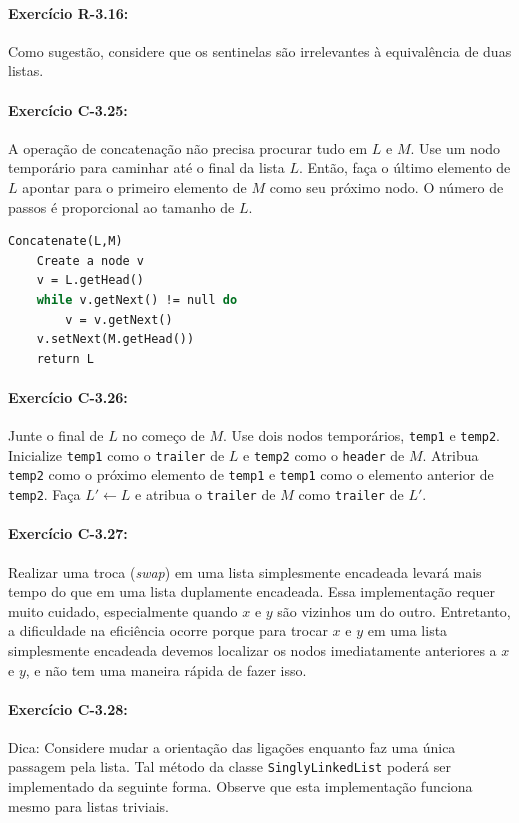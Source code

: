 \paragraph{Exercício R-3.16:}
Como sugestão, considere que os sentinelas são irrelevantes à equivalência de duas listas.

\paragraph{Exercício C-3.25:}
A operação de concatenação não precisa procurar tudo em $L$ e $M$. Use um nodo temporário para caminhar até o final da lista $L$. Então, faça o último elemento de $L$ apontar para o primeiro elemento de $M$ como seu próximo nodo. O número de passos é proporcional ao tamanho de $L$.

\begin{lstlisting}[frame=single,language=Pascal]
Concatenate(L,M)
	Create a node v
	v = L.getHead()
	while v.getNext() != null do
		v = v.getNext()
	v.setNext(M.getHead())
	return L
\end{lstlisting}

\paragraph{Exercício C-3.26:}
Junte o final de $L$ no começo de $M$. Use dois nodos temporários, \texttt{temp1} e \texttt{temp2}. Inicialize \texttt{temp1} como o \texttt{trailer} de $L$ e \texttt{temp2} como o \texttt{header} de $M$. Atribua \texttt{temp2} como o próximo elemento de \texttt{temp1} e \texttt{temp1} como o elemento anterior de \texttt{temp2}. Faça $L' \gets L$ e atribua o \texttt{trailer} de $M$ como \texttt{trailer} de $L'$.

\paragraph{Exercício C-3.27:}
Realizar uma troca (\textit{swap}) em uma lista simplesmente encadeada levará mais tempo do que em uma lista duplamente encadeada. Essa implementação requer muito cuidado, especialmente quando $x$ e $y$ são vizinhos um do outro. Entretanto, a dificuldade na eficiência ocorre porque para trocar $x$ e $y$ em uma lista simplesmente encadeada devemos localizar os nodos imediatamente anteriores a $x$ e $y$, e não tem uma maneira rápida de fazer isso.

\paragraph{Exercício C-3.28:}
Dica: Considere mudar a orientação das ligações enquanto faz uma única passagem pela lista. Tal método da classe \texttt{SinglyLinkedList} poderá ser implementado da seguinte forma. Observe que esta implementação funciona mesmo para listas triviais.

